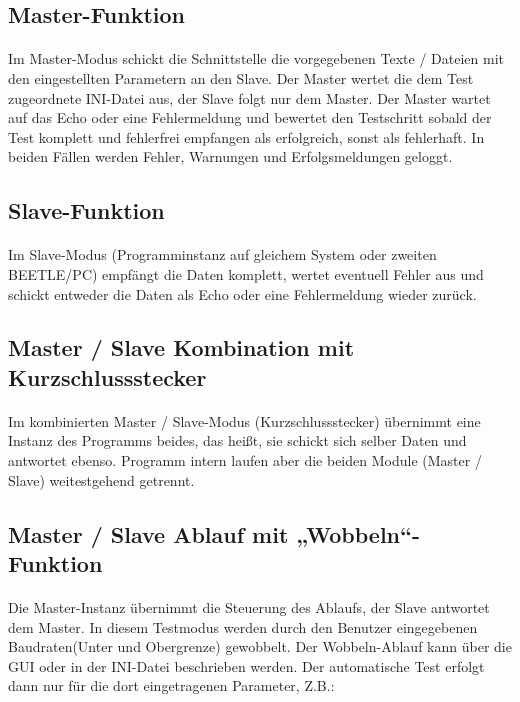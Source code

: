 \subsection{Master-Funktion}
\paragraph{}
Im Master-Modus schickt die Schnittstelle die vorgegebenen Texte / Dateien mit den eingestellten Parametern an den Slave. Der Master wertet die dem Test zugeordnete INI-Datei aus, der Slave folgt nur dem Master. Der Master wartet auf das Echo oder eine Fehlermeldung und bewertet den Testschritt sobald der Test komplett und fehlerfrei empfangen als erfolgreich, sonst als fehlerhaft. In beiden Fällen werden Fehler, Warnungen und Erfolgsmeldungen geloggt.


\subsection{Slave-Funktion}
\paragraph{}
Im Slave-Modus (Programminstanz auf gleichem System oder zweiten BEETLE/PC) empfängt die Daten komplett,  wertet eventuell Fehler aus und schickt entweder die Daten als Echo oder eine Fehlermeldung wieder zurück. 

\subsection{Master / Slave Kombination mit Kurzschlussstecker}
\paragraph{}
Im kombinierten Master / Slave-Modus (Kurzschlussstecker) übernimmt eine Instanz des Programms beides, das heißt, sie schickt sich selber Daten und antwortet ebenso. Programm intern laufen aber die beiden Module (Master / Slave) weitestgehend getrennt.

\subsection{Master / Slave Ablauf mit „Wobbeln“-Funktion}
\paragraph{}
Die Master-Instanz übernimmt die Steuerung des Ablaufs, der Slave antwortet dem Master. In diesem Testmodus werden durch den Benutzer eingegebenen Baudraten(Unter und Obergrenze) gewobbelt. Der Wobbeln-Ablauf kann über die GUI oder in der INI-Datei beschrieben werden. Der automatische Test erfolgt dann nur für die dort eingetragenen Parameter, Z.B.:

